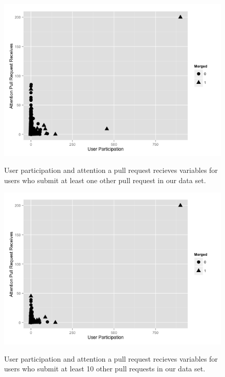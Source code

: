 \documentclass{iitthesis}
\begin{document}
\begin{figure}[p] \centering \label{fig:aprr_up_repeaters}
\includegraphics[scale=0.6]{figures/aprr_up_repeaters_ggplot.png} \caption{User
participation and attention a pull request recieves variables for users who
submit at least one other pull request in our data set.} \end{figure}

\begin{figure}[p] \centering \label{fig:aprr_up_repeaters_10}
\includegraphics[scale=0.6]{figures/aprr_up_repeaters_10_ggplot.png}
\caption{User participation and attention a pull request recieves variables for
users who submit at least 10 other pull requests in our data set.} \end{figure}
\end{document}
